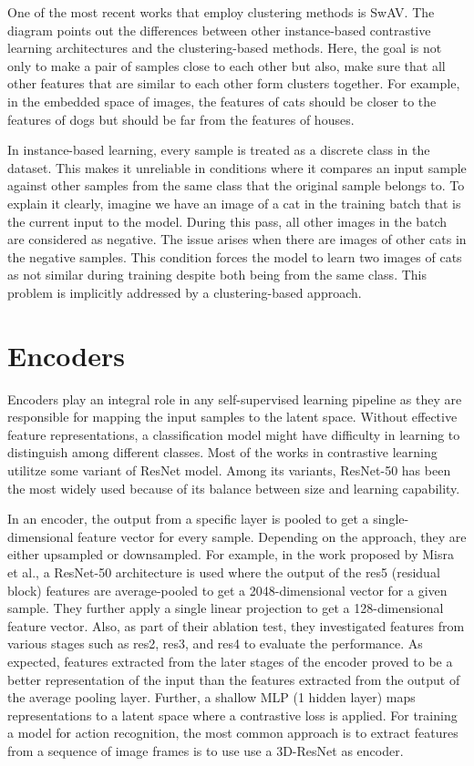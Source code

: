 \documentclass[conference]{IEEEtran}
\begin{document}
One of the most recent works that employ clustering methods is SwAV. The diagram points out the differences between other instance-based contrastive learning architectures and the clustering-based methods.
Here, the goal is not only to make a pair of samples close to each other but also, make sure that all other features that are similar to each other form clusters together.
For example, in the embedded space of images, the features of cats should be closer to the features of dogs but should be far from the features of houses.

In instance-based learning, every sample is treated as a discrete class in the dataset. 
This makes it unreliable in conditions where it compares an input sample against other samples from the same class that the original sample belongs to.
To explain it clearly, imagine we have an image of a cat in the training batch that is the current input to the model.
During this pass, all other images in the batch are considered as negative. The issue arises when there are images of other cats in the negative samples. This condition forces the model to learn two images of cats as not similar during training despite both being from the same class.
This problem is implicitly addressed by a clustering-based approach.

\section{Encoders}
Encoders play an integral role in any self-supervised learning pipeline as they are responsible for mapping the input samples to the latent space.
Without effective feature representations, a classification model might have difficulty in learning to distinguish among different classes. Most of the works in contrastive learning utilitze some variant of ResNet model.
Among its variants, ResNet-50 has been the most widely used because of its balance between size and learning capability.

In an encoder, the output from a specific layer is pooled to get a single-dimensional feature vector for every sample.
Depending on the approach, they are either upsampled or downsampled. For example, in the work proposed by Misra et al., a ResNet-50 architecture is used where the output of the res5 (residual block) features are average-pooled to get a 2048-dimensional vector for a given sample.
They further apply a single linear projection to get a 128-dimensional feature vector. Also, as part of their ablation test, they investigated features from various stages such as res2, res3, and res4 to evaluate the performance.
As expected, features extracted from the later stages of the encoder proved to be a better representation of the input than the features extracted from the output of the average pooling layer.
Further, a shallow MLP (1 hidden layer) maps representations to a latent space where a contrastive loss is applied.
For training a model for action recognition, the most common approach is to extract features from a sequence of image frames is to use use a 3D-ResNet as encoder.
\end{document}

